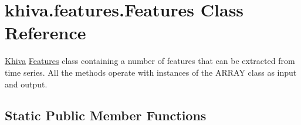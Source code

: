 \hypertarget{classkhiva_1_1features_1_1_features}{}\section{khiva.\+features.\+Features Class Reference}
\label{classkhiva_1_1features_1_1_features}


\mbox{\hyperlink{classkhiva_1_1_khiva}{Khiva}} \mbox{\hyperlink{classkhiva_1_1features_1_1_features}{Features}} class containing a number of features that can be extracted from time series. All the methods operate with instances of the A\+R\+R\+AY class as input and output.  


\subsection*{Static Public Member Functions}
